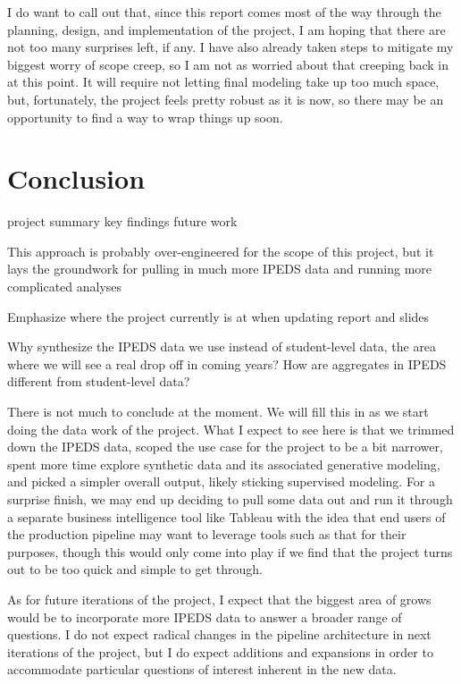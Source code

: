 \documentclass[sigconf, authorversion, nonacm]{acmart}
\begin{document}
    I do want to call out that, since this report comes most of the way through the planning, design, and implementation of the project, I am hoping that there are not too many surprises left, if any. I have also already taken steps to mitigate my biggest worry of scope creep, so I am not as worried about that creeping back in at this point. It will require not letting final modeling take up too much space, but, fortunately, the project feels pretty robust as it is now, so there may be an opportunity to find a way to wrap things up soon.

\section{Conclusion}


    project summary
    key findings
    future work

    This approach is probably over-engineered for the scope of this project, but it lays the groundwork for pulling in much more IPEDS data and running more complicated analyses

    Emphasize where the project currently is at when updating report and slides

    Why synthesize the IPEDS data we use instead of student-level data, the area where we will see a real drop off in coming years? How are aggregates in IPEDS different from student-level data?




    There is not much to conclude at the moment. We will fill this in as we start doing the data work of the project. What I expect to see here is that we trimmed down the IPEDS data, scoped the use case for the project to be a bit narrower, spent more time explore synthetic data and its associated generative modeling, and picked a simpler overall output, likely sticking supervised modeling. For a surprise finish, we may end up deciding to pull some data out and run it through a separate business intelligence tool like Tableau with the idea that end users of the production pipeline may want to leverage tools such as that for their purposes, though this would only come into play if we find that the project turns out to be too quick and simple to get through.

    As for future iterations of the project, I expect that the biggest area of grows would be to incorporate more IPEDS data to answer a broader range of questions. I do not expect radical changes in the pipeline architecture in next iterations of the project, but I do expect additions and expansions in order to accommodate particular questions of interest inherent in the new data.
\end{document}
